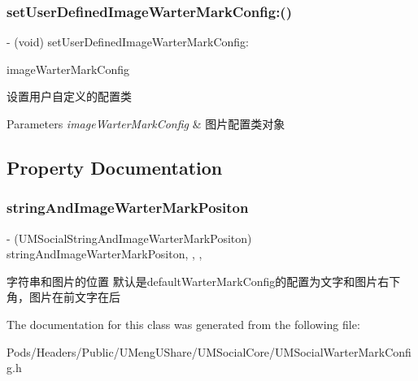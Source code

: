 \subsubsection{\texorpdfstring{set\+User\+Defined\+Image\+Warter\+Mark\+Config\+:()}{setUserDefinedImageWarterMarkConfig:()}\hspace{0.1cm}{\footnotesize\ttfamily [2/2]}}
{\footnotesize\ttfamily -\/ (void) set\+User\+Defined\+Image\+Warter\+Mark\+Config\+: \begin{DoxyParamCaption}\item[{(\mbox{\hyperlink{interface_u_m_social_image_warter_mark_config}{U\+M\+Social\+Image\+Warter\+Mark\+Config}} $\ast$)}]{image\+Warter\+Mark\+Config }\end{DoxyParamCaption}}

设置用户自定义的配置类


\begin{DoxyParams}{Parameters}
{\em image\+Warter\+Mark\+Config} & 图片配置类对象 \\
\hline
\end{DoxyParams}


\subsection{Property Documentation}
\mbox{\label{interface_u_m_social_warter_mark_config_a4e30755580ad7774fdcf27f471e39be4}} 
\subsubsection{\texorpdfstring{string\+And\+Image\+Warter\+Mark\+Positon}{stringAndImageWarterMarkPositon}}
{\footnotesize\ttfamily -\/ (U\+M\+Social\+String\+And\+Image\+Warter\+Mark\+Positon) string\+And\+Image\+Warter\+Mark\+Positon\hspace{0.3cm}{\ttfamily [read]}, {\ttfamily [write]}, {\ttfamily [nonatomic]}, {\ttfamily [assign]}}

字符串和图片的位置 默认是default\+Warter\+Mark\+Config的配置为文字和图片右下角，图片在前文字在后 

The documentation for this class was generated from the following file\+:\begin{DoxyCompactItemize}
\item 
Pods/\+Headers/\+Public/\+U\+Meng\+U\+Share/\+U\+M\+Social\+Core/U\+M\+Social\+Warter\+Mark\+Config.\+h\end{DoxyCompactItemize}
